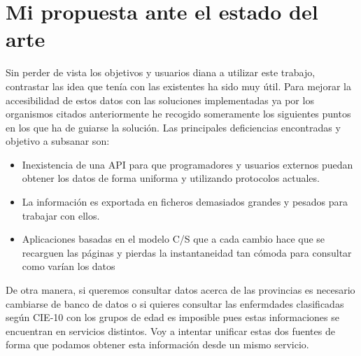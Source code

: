 \section{Mi propuesta ante el estado del arte}
Sin perder de vista los objetivos y usuarios diana a utilizar este trabajo, contrastar las idea
que tenía con las existentes ha sido muy útil. Para mejorar la accesibilidad de estos datos con las soluciones implementadas 
ya por los organismos citados anteriormente he recogido someramente los siguientes puntos en los que ha de guiarse la 
solución. Las principales deficiencias encontradas y objetivo a subsanar son:
\begin{itemize}
    \item Inexistencia de una API para que programadores y usuarios externos puedan obtener los datos
    de forma uniforma y utilizando protocolos actuales.
    \item La información es exportada en ficheros demasiados grandes y pesados para trabajar con ellos.
    \item Aplicaciones basadas en el modelo C/S que a cada cambio hace que se recarguen las páginas y pierdas
    la instantaneidad tan cómoda para consultar como varían los datos
\end{itemize}

De otra manera, si queremos consultar datos acerca de las provincias es necesario cambiarse de banco de datos o si quieres
consultar las enfermdades clasificadas según CIE-10 con los grupos de edad es imposible pues estas informaciones
se encuentran en servicios distintos. Voy a intentar unificar estas dos fuentes de forma que podamos obtener esta información
desde un mismo servicio.
